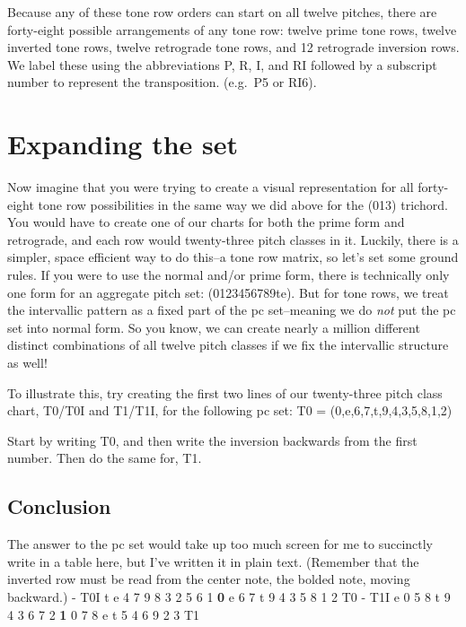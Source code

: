 \documentclass{book}
\begin{document}
Because any of these tone row orders can start on all twelve pitches, there
are forty-eight possible arrangements of any tone row: twelve prime tone rows,
twelve inverted tone rows, twelve retrograde tone rows, and 12 retrograde
inversion rows. We label these using the abbreviations P, R, I, and RI
followed by a subscript number to represent the transposition. (e.g.~P5 or
RI6).

\hypertarget{expanding-the-set}{%
\section{Expanding the set}\label{expanding-the-set}}

Now imagine that you were trying to create a visual representation for all
forty-eight tone row possibilities in the same way we did above for the (013)
trichord. You would have to create one of our charts for both the prime form
and retrograde, and each row would twenty-three pitch classes in it. Luckily,
there is a simpler, space efficient way to do this--a tone row matrix, so
let's set some ground rules. If you were to use the normal and/or prime form,
there is technically only one form for an aggregate pitch set: (0123456789te).
But for tone rows, we treat the intervallic pattern as a fixed part of the pc
set--meaning we do \emph{not} put the pc set into normal form. So you know, we
can create nearly a million different distinct combinations of all twelve
pitch classes if we fix the intervallic structure as well!

To illustrate this, try creating the first two lines of our twenty-three pitch
class chart, T0/T0I and T1/T1I, for the following pc set: T0 =
(0,e,6,7,t,9,4,3,5,8,1,2)

Start by writing T0, and then write the inversion backwards from the first
number. Then do the same for, T1.

\hypertarget{conclusion-24}{%
\subsection{Conclusion}\label{conclusion-24}}

The answer to the pc set would take up too much screen for me to succinctly
write in a table here, but I've written it in plain text. (Remember that the
inverted row must be read from the center note, the bolded note, moving
backward.) - T0I t e 4 7 9 8 3 2 5 6 1 \textbf{0} e 6 7 t 9 4 3 5 8 1 2 T0 -
T1I e 0 5 8 t 9 4 3 6 7 2 \textbf{1} 0 7 8 e t 5 4 6 9 2 3 T1
\end{document}
